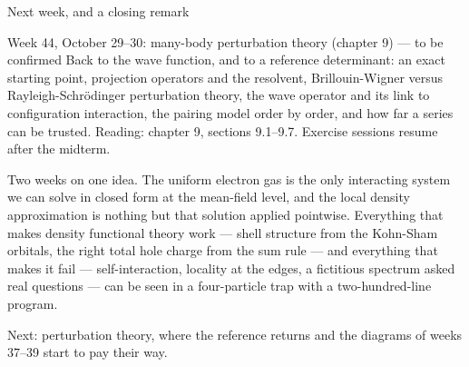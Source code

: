 \documentclass[aspectratio=169,10pt]{beamer}
\begin{document}
\begin{frame}{Next week, and a closing remark}
  \begin{exampleblock}{Week 44, October 29--30: many-body perturbation theory (chapter 9) --- to be confirmed}
    \small
    Back to the wave function, and to a reference determinant: an exact starting point, projection operators and the resolvent, Brillouin-Wigner versus Rayleigh-Schr\"odinger perturbation theory, the wave operator and its link to configuration interaction, the pairing model order by order, and how far a series can be trusted. Reading: chapter 9, sections 9.1--9.7. Exercise sessions resume after the midterm.
  \end{exampleblock}
  \vspace{0.6em}
  \small
  Two weeks on one idea. The uniform electron gas is the only interacting system we can solve in closed form at the mean-field level, and the local density approximation is nothing but that solution applied pointwise. Everything that makes density functional theory work --- shell structure from the Kohn-Sham orbitals, the right total hole charge from the sum rule --- and everything that makes it fail --- self-interaction, locality at the edges, a fictitious spectrum asked real questions --- can be seen in a four-particle trap with a two-hundred-line program.
  \vspace{0.4em}

  \centering\alert{Next: perturbation theory, where the reference returns and the diagrams of weeks 37--39 start to pay their way.}
\end{frame}
\end{document}
